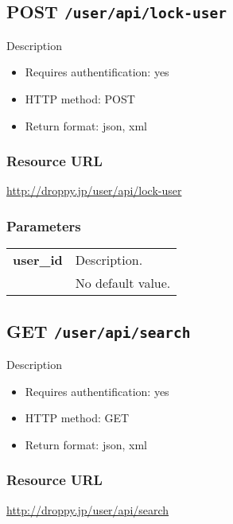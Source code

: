 \documentclass[11pt,a4paper]{article}
\newcommand{\content}[1]{\begin{minipage}{10cm}\vspace{2mm}#1\vspace{2mm}\end{minipage}}
\begin{document}
      \newpage
      
      
  \subsection*{POST {\tt /user/api/lock-user}}
  Description
  \begin{itemize}
  \item Requires authentification: yes
  \item HTTP method: POST
  \item Return format: json, xml
  \end{itemize}
  \subsubsection*{Resource URL}
  \url{http://droppy.jp/user/api/lock-user}
  \subsubsection*{Parameters}
  \begin{table}[h]
    \begin{center}
      \begin{tabular}{l l}
        \hline 
      \textbf{user\_id} & \content{Description. }
      \\
       & No default value.\\
      \hline
      \end{tabular}
    \end{center}
  \end{table}
  
      \newpage
      
      
  \subsection*{GET {\tt /user/api/search}}
  Description
  \begin{itemize}
  \item Requires authentification: yes
  \item HTTP method: GET
  \item Return format: json, xml
  \end{itemize}
  \subsubsection*{Resource URL}
  \url{http://droppy.jp/user/api/search}
\end{document}
